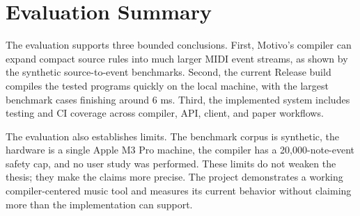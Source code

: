 \section{Evaluation Summary}\label{sec:evaluation-summary}

The evaluation supports three bounded conclusions.
First, Motivo's compiler can expand compact source rules into much larger MIDI event streams, as shown by the synthetic
source-to-event benchmarks.
Second, the current Release build compiles the tested programs quickly on the local machine, with the largest benchmark
cases finishing around 6 ms.
Third, the implemented system includes testing and CI coverage across compiler, API, client, and paper workflows.

The evaluation also establishes limits.
The benchmark corpus is synthetic, the hardware is a single Apple M3 Pro machine, the compiler has a 20,000-note-event
safety cap, and no user study was performed.
These limits do not weaken the thesis; they make the claims more precise.
The project demonstrates a working compiler-centered music tool and measures its current behavior without claiming more
than the implementation can support.
